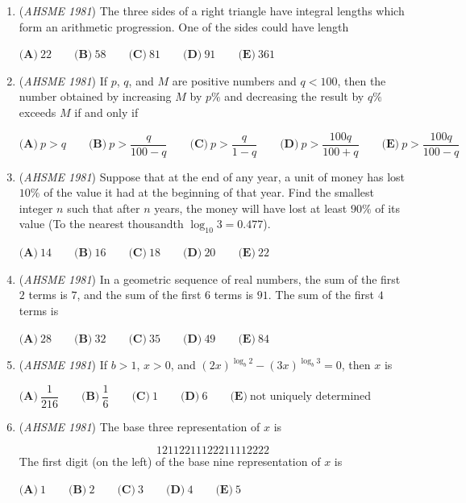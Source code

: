 \begin{enumerate}
	\item (\textit{AHSME 1981}) The three sides of a right triangle have integral lengths which form an arithmetic progression. One of the sides could have length


 $\textbf{(A)}\ 22\qquad\textbf{(B)}\ 58\qquad\textbf{(C)}\ 81\qquad\textbf{(D)}\ 91\qquad\textbf{(E)}\ 361$


	\item (\textit{AHSME 1981}) If $p$, $q$, and $M$ are positive numbers and $q<100$, then the number obtained by increasing $M$ by $p\%$ and decreasing the result by $q\%$ exceeds $M$ if and only if


 $\textbf{(A)}\ p>q \qquad\textbf{(B)}\ p>\dfrac{q}{100-q}\qquad\textbf{(C)}\ p>\dfrac{q}{1-q}\qquad \textbf{(D)}\ p>\dfrac{100q}{100+q}\qquad\textbf{(E)}\ p>\dfrac{100q}{100-q}$


	\item (\textit{AHSME 1981}) Suppose that at the end of any year, a unit of money has lost $10\%$ of the value it had at the beginning of that year. Find the smallest integer $n$ such that after $n$ years, the money will have lost at least $90\%$ of its value (To the nearest thousandth $\log_{10} 3 = 0.477$).


 $\textbf{(A)}\ 14\qquad\textbf{(B)}\ 16\qquad\textbf{(C)}\ 18\qquad\textbf{(D)}\ 20\qquad\textbf{(E)}\ 22$


	\item (\textit{AHSME 1981}) In a geometric sequence of real numbers, the sum of the first $2$ terms is $7$, and the sum of the first $6$ terms is $91$. The sum of the first $4$ terms is


 $\textbf{(A)}\ 28\qquad\textbf{(B)}\ 32\qquad\textbf{(C)}\ 35\qquad\textbf{(D)}\ 49\qquad\textbf{(E)}\ 84$


	\item (\textit{AHSME 1981}) If $b>1$, $x>0$, and $(2x)^{\log_b 2}-(3x)^{\log_b 3}=0$, then $x$ is


 $\textbf{(A)}\ \dfrac{1}{216}\qquad\textbf{(B)}\ \dfrac{1}{6}\qquad\textbf{(C)}\ 1\qquad\textbf{(D)}\ 6\qquad\textbf{(E)}\ \text{not uniquely determined}$


	\item (\textit{AHSME 1981}) The base three representation of $x$ is 

 \[12112211122211112222\]
The first digit (on the left) of the base nine representation of $x$ is


 $\textbf{(A)}\ 1\qquad\textbf{(B)}\ 2\qquad\textbf{(C)}\ 3\qquad\textbf{(D)}\ 4\qquad\textbf{(E)}\ 5$



\end{enumerate}
